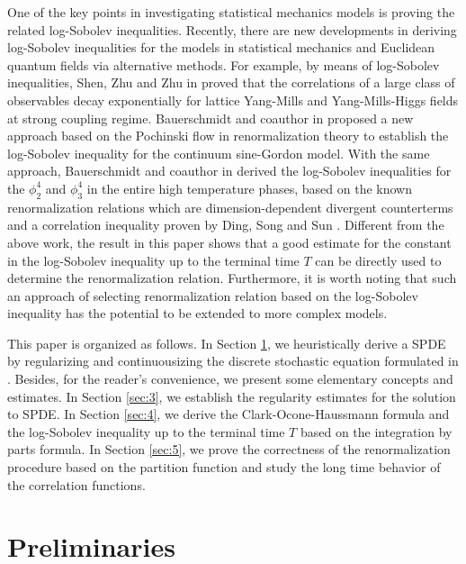 \documentclass[11pt]{article}
\numberwithin{equation}{section}%
\numberwithin{figure}{section}%
\theoremstyle{remark}
\begin{document}
    One of the key points in investigating statistical mechanics models is proving the related log-Sobolev inequalities. Recently, there are new developments in deriving log-Sobolev inequalities for the models in statistical mechanics and  Euclidean quantum fields via alternative methods. For example, by means of log-Sobolev inequalities, Shen, Zhu and Zhu in \cite{Shen2021document,Shen2024document} proved that the correlations of a large class of observables decay exponentially for lattice Yang-Mills and Yang-Mills-Higgs fields at strong coupling regime. Bauerschmidt and coauthor in \cite{Bauerschmidt2021document} proposed a new approach based on the Pochinski flow in renormalization theory to establish the log-Sobolev inequality for the continuum sine-Gordon model. With the same approach, Bauerschmidt and coauthor in \cite{Bauerschmidt20241document} derived the log-Sobolev inequalities for the $\phi^{4}_{2}$ and $\phi^{4}_{3}$ in the entire high temperature phases, based on the known renormalization relations which are dimension-dependent divergent counterterms and a correlation inequality proven by Ding, Song and Sun \cite{Ding2023document}. Different from the above work, the result in this paper shows that a good estimate for the constant in the log-Sobolev inequality up to the terminal time $T$ can be directly used to determine the renormalization relation. Furthermore, it is worth noting that such an approach of selecting renormalization relation based on the log-Sobolev inequality has the potential to be extended to more complex models.
	
 This paper is organized as follows. In Section \ref{sec:2}, we heuristically derive a SPDE by regularizing and continuousizing the discrete stochastic equation formulated in \cite{Cui2022document,Cui2024document}. Besides, for the reader's convenience, we present some elementary concepts and estimates. In Section \ref{sec:3}, we establish the regularity estimates for the solution to SPDE. In Section \ref{sec:4}, we derive the Clark-Ocone-Haussmann formula and the log-Sobolev inequality up to the terminal time $T$ based on the integration by parts formula. In Section \ref{sec:5}, we prove the correctness of the renormalization procedure based on the partition function and study the long time behavior of the correlation functions. 
	
\section{Preliminaries}\label{sec:2}
\end{document}
